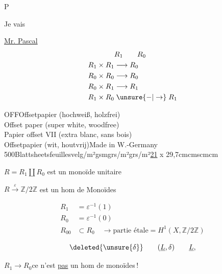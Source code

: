 
P

Je vais 

\uline{} \uline{Mr. Pascal}\\

\[
\begin{aligned}
&R_1\qquad R_0\\
R_1\times R_1&\longrightarrow R_0\\
R_0\times R_0&\longrightarrow R_0\\
R_0\times R_1&\longrightarrow R_1\\
R_1\times R_0&\mathrel{\unsure{-|\to}} R_1
\end{aligned}
\]

OFF\quad Offsetpapier (hochweiß, holzfrei)\\
Offset paper (super white, woodfree)\\
Papier offset VII (extra blanc, sans bois)\\
Offsetpapier (wit, houtvrij)\quad Made in W.-Germany\\
500\quad Blatt\quad sheets\quad feuilles\quad vel\quad g/m²\quad gsm\quad grs/m²\quad grs/m²\qquad \uline{21} x 29,7\quad cm\quad cms\quad cm\quad cm

$R=R_1\amalg R_0$ est un monoïde unitaire

 $R\xrightarrow{\varepsilon}\mathbb Z/2\mathbb Z$ est un hom de Monoïdes

\[
\begin{aligned}
R_1&=\varepsilon^{-1}(1)\\
R_0&=\varepsilon^{-1}(0)\\
R_{00}&\subset R_0\quad\longrightarrow\text{partie étale}=H^1(X,\mathbb Z/2\mathbb Z)
\end{aligned}
\]


\[\deleted{\unsure{\delta}}\qquad(\underline L,\delta)\qquad\underline L,\]

$R_1\longrightarrow R_0$\qquad ce n'est \uline{pas} un hom de monoïdes\,!

